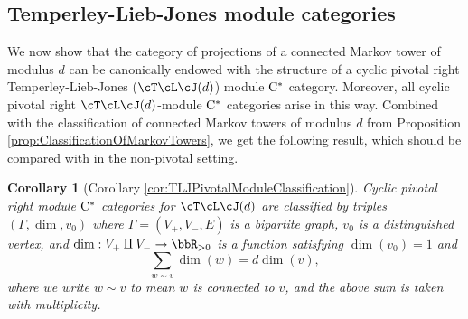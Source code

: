 \documentclass[11pt]{article}
\theoremstyle{plain}
\newtheorem*{cor*}{Corollary}
\theoremstyle{definition}
\newcommand{\Cstar}{\rm{C^*}}
\begin{document}
\subsection{Temperley-Lieb-Jones module categories} 
\label{sec:TLJmodules}

We now show that the category of projections of a connected Markov tower of modulus $d$ can be canonically endowed with the structure of a cyclic pivotal right Temperley-Lieb-Jones ($\cT\cL\cJ(d)$) module $\Cstar$ category.
Moreover, all cyclic pivotal right $\cT\cL\cJ(d)$-module $\Cstar$ categories arise in this way.
Combined with the classification of connected Markov towers of modulus $d$ from Proposition \ref{prop:ClassificationOfMarkovTowers}, we get the following result, which should be compared with \cite{MR3420332} in the non-pivotal setting.

\begin{cor*}[Corollary \ref{cor:TLJPivotalModuleClassification}]
Cyclic pivotal right module $\Cstar$ categories for $\cT\cL\cJ(d)$ are classified by triples $(\Gamma, \dim, v_0)$ where $\Gamma=(V_+, V_- , E)$ is a bipartite graph, $v_0$ is a distinguished vertex, and $\dim : V_+\amalg V_- \to \bbR_{>0}$ is a function satisfying $\dim(v_0) = 1$ and
$$
\sum_{w\sim v} \dim(w) = d \dim(v),
$$
where we write $w\sim v$ to mean $w$ is connected to $v$, and the above sum is taken with multiplicity.
\end{cor*}
\end{document}
